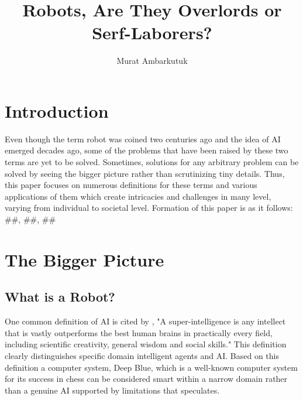 \documentclass[man]{apa6}
\title{Robots, Are They Overlords or Serf-Laborers?}
\author{Murat Ambarkutuk}
\affiliation{English Language Institute, University of Delaware \\ murata@udel.edu}
\begin{document}
\maketitle
\section{Introduction}
Even though the term robot was coined two centuries ago and the idea of AI emerged decades ago, some of the problems that have been raised by these two terms are yet to be solved. Sometimes, solutions for any arbitrary problem can be solved by seeing the bigger picture rather than scrutinizing tiny details. Thus, this paper focuses on numerous definitions for these terms and various applications of them which create intricacies and challenges in many level, varying from individual to societal level. Formation of this paper is as it follows: \#\#, \#\#, \#\#

\section{The Bigger Picture}
\subsection{What is a Robot?}
One common definition of AI is cited by , "A super-intelligence is any intellect that is vastly outperforms the best human brains in practically every field, including scientific creativity, general wisdom and social skills." This definition clearly distinguishes specific domain intelligent agents and AI. Based on this definition a computer system, Deep Blue, which is a well-known computer system for its success in chess can be considered smart within a narrow domain rather than a genuine AI supported by limitations that \citeauthor{duff} \citeyear[p.~34]{duff} speculates.\par
\end{document}
